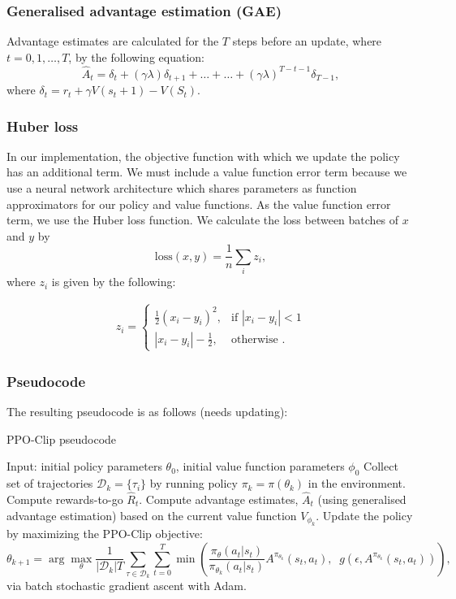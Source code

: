 \documentclass[12pt,a4paper]{article}
\begin{document}
\subsubsection{Generalised advantage estimation (GAE)}
Advantage estimates are calculated for the $T$ steps before an update, where $t = 0, 1, \dots, T$, by the following equation: $$\hat{A}_t = \delta_t + (\gamma\lambda)\delta_{t+1} + \dots + \dots + (\gamma\lambda)^{T-t-1}\delta_{T-1},$$ where $\delta_t = r_t + \gamma V(s_t+1) - V(S_t)$.

\subsubsection{Huber loss}
In our implementation, the objective function with which we update the policy has an additional term. We must include a value function error term because we use a neural network architecture which shares parameters as function approximators for our policy and value functions. As the value function error term, we use the Huber loss function. We calculate the loss between batches of $x$ and $y$ by $$\text{loss}(x, y) = \frac{1}{n} \sum_{i} z_{i},$$ where $z_i$ is given by the following:

\[\begin{aligned}
z_{i} =
\begin{cases}
\frac{1}{2} (x_i - y_i)^2, & \text{if } |x_i - y_i| < 1 \\
|x_i - y_i| - \frac{1}{2}, & \text{otherwise }.
\end{cases}
\end{aligned}\]

\subsubsection{Pseudocode}
The resulting pseudocode is as follows (needs updating):

\begin{algorithm}[h]
    \caption{PPO-Clip pseudocode}
    \label{alg1}
\begin{algorithmic}[1]
    \STATE Input: initial policy parameters $\theta_0$, initial value function parameters $\phi_0$
    \STATE Collect set of trajectories ${\mathcal D}_k = \{\tau_i\}$ by running policy $\pi_k = \pi(\theta_k)$ in the environment.
    \STATE Compute rewards-to-go $\hat{R}_t$.
    \STATE Compute advantage estimates, $\hat{A}_t$ (using generalised advantage estimation) based on the current value function $V_{\phi_k}$.
    \STATE Update the policy by maximizing the PPO-Clip objective:
        \begin{equation*}
        \theta_{k+1} = \arg \max_{\theta} \frac{1}{|{\mathcal D}_k| T} \sum_{\tau \in {\mathcal D}_k} \sum_{t=0}^T \min\left(
            \frac{\pi_{\theta}(a_t|s_t)}{\pi_{\theta_k}(a_t|s_t)}  A^{\pi_{\theta_k}}(s_t,a_t), \;\;
            g(\epsilon, A^{\pi_{\theta_k}}(s_t,a_t))
        \right),
        \end{equation*}
        via batch stochastic gradient ascent with Adam.
    \ENDFOR
\end{algorithmic}
\end{algorithm}
\end{document}
